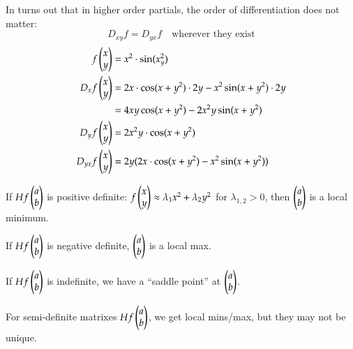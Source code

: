 In turns out that in higher order partials, the order of differentiation does not matter: 
\[D_{xy}f=D_{yx}f\quad \text{wherever they exist}\]
\begin{align*}
	f\begin{pmatrix} x \\ y \end{pmatrix} &= x^2\cdot \sin(x_y^2) \\
	D_xf\begin{pmatrix} x \\ y \end{pmatrix} &= 2x \cdot \cos(x+y^2)\cdot 2y -x^2\sin(x+y^2)\cdot 2y \\
	&= 4xy\cos(x+y^2)-2x^2y\sin(x + y^2) \\
	D_yf\begin{pmatrix} x \\ y \end{pmatrix}&=2x^2y\cdot \cos(x +y^2) \\
	D_{yx}f\begin{pmatrix} x \\ y \end{pmatrix} &= 2y (2x\cdot \cos(x+y^2)-x^2\sin(x+y^2))
\end{align*}

If $Hf\begin{pmatrix} a \\ b \end{pmatrix}$ is positive definite: $f\begin{pmatrix} x \\ y \end{pmatrix}\approx \lambda_1x^2 + \lambda_2y^2$ for $\lambda_{1,2}>0$, then $\begin{pmatrix} a \\ b \end{pmatrix}$ is a local minimum. 

If $Hf\begin{pmatrix} a \\ b \end{pmatrix}$ is negative definite, $\begin{pmatrix} a \\ b \end{pmatrix}$ is a local max. 

If $Hf\begin{pmatrix} a \\ b \end{pmatrix}$ is indefinite, we have a ``saddle point'' at $\begin{pmatrix} a \\ b \end{pmatrix}$. 

For semi-definite matrixes $Hf\begin{pmatrix} a \\ b \end{pmatrix}$, we get local mins/max, but they may not be unique. 

